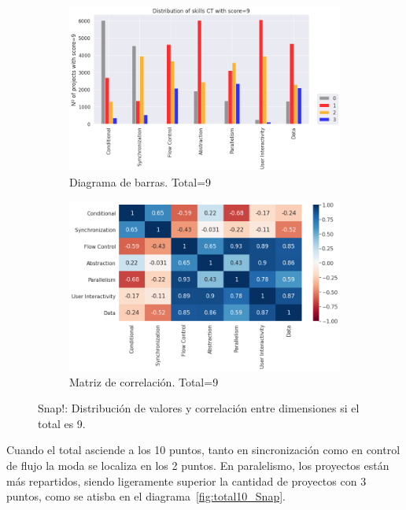 \documentclass[a4paper, 12pt]{book}
\begin{document}
\begin{figure}[H]
    \centering
    \begin{subfigure}[h]{.49\textwidth} 
        \includegraphics[width=\textwidth]{img/distribucion_9_Snap}
        \caption{Diagrama de barras. Total=9}
        \label{fig:total9_Snap}
    \end{subfigure}       
    \begin{subfigure}[h]{.49\textwidth} 
        \includegraphics[width=\textwidth]{img/corr_9_Snap}
        \caption{Matriz de correlación. Total=9}
        \label{fig:corr9_Snap}
    \end{subfigure}
    \caption{Snap!: Distribución de valores y correlación entre dimensiones si el total es 9.}
\end{figure}

Cuando el total asciende a los 10 puntos, tanto en sincronización como en control de flujo la moda se localiza en los 2 puntos. En paralelismo, los proyectos están más repartidos, siendo ligeramente superior la cantidad de proyectos con 3 puntos, como se atisba en el diagrama~\ref{fig:total10_Snap}.
\end{document}
